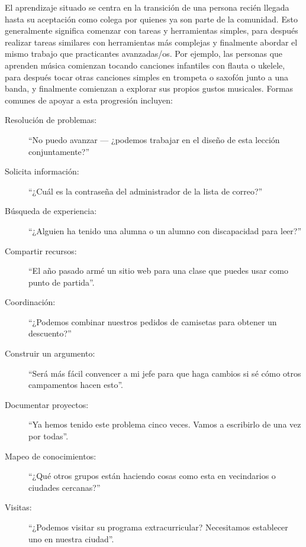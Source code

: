 El aprendizaje situado se centra en la transición de una persona recién llegada
hasta su aceptación como colega por quienes ya son parte de la comunidad.
Esto generalmente significa comenzar con tareas y herramientas simples,
para después realizar tareas similares con herramientas más complejas
y finalmente abordar el mismo trabajo que practicantes avanzadas/os.
Por ejemplo,
las personas que aprenden música comienzan  tocando canciones infantiles con flauta o ukelele, para
después tocar otras canciones simples en trompeta o saxofón junto a una banda,
y finalmente comienzan a explorar sus propios gustos musicales.
Formas comunes de apoyar a esta progresión incluyen:

\newpage
\begin{description}

\item[Resolución de problemas:]
  ``No puedo avanzar --- ¿podemos trabajar en el diseño de esta lección conjuntamente?''

\item[Solicita información:]
  ``¿Cuál es la contraseña del administrador de la lista de correo?''

\item[Búsqueda de experiencia:]
  ``¿Alguien ha tenido una alumna o un alumno con discapacidad para leer?''

\item[Compartir recursos:]
  ``El año pasado armé un sitio web para una clase que puedes usar como punto de partida''.
\item[Coordinación:]
  ``¿Podemos combinar nuestros pedidos de camisetas para obtener un descuento?''

\item[Construir un argumento:]
  ``Será más fácil convencer a mi jefe para que haga cambios si sé cómo otros campamentos hacen esto''.

\item[Documentar proyectos:]
  ``Ya hemos tenido este problema cinco veces. Vamos a escribirlo de una vez por todas''.

\item[Mapeo de conocimientos:]
  ``¿Qué otros grupos están haciendo cosas como esta en vecindarios o ciudades cercanas?''

\item[Visitas:]
  ``¿Podemos visitar su programa extracurricular? Necesitamos establecer uno en nuestra ciudad''.

\end{description}


